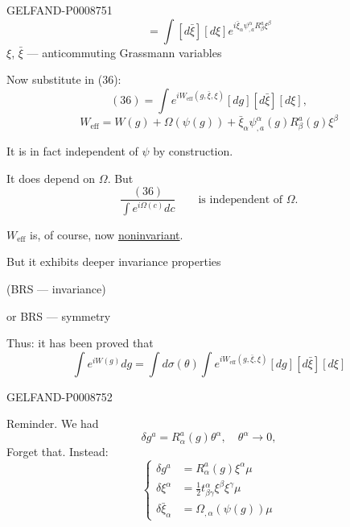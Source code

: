 \begin{GelfandAdjacentEvidence}{GELFAND-P000875}{1}
\[
=\int[d\bar\xi][d\xi]e^{i\bar\xi_\alpha\psi^\alpha_{,a}R_\beta^a\xi^\beta}
\]
$\xi$, $\bar\xi$ --- anticommuting Grassmann variables

Now substitute in (36):
\begin{equation*}
(36)=\int e^{iW_{\mathrm{eff}}(g,\bar\xi,\xi)}[dg][d\bar\xi][d\xi],
\tag{38}
\end{equation*}
\begin{equation*}
W_{\mathrm{eff}}=W(g)+\Omega(\psi(g))+\bar\xi_\alpha\psi^\alpha_{,a}(g)R_\beta^a(g)\xi^\beta
\tag{39}
\end{equation*}

It is in fact independent of $\psi$ by construction.

It does depend on $\Omega$. But
\begin{equation*}
\frac{(36)}{\int e^{i\Omega(c)}dc}\qquad\text{is independent of $\Omega$.}
\tag{40}
\end{equation*}

$W_{\mathrm{eff}}$ is, of course, now \uline{noninvariant}.

But it exhibits deeper invariance properties

(BRS --- invariance)

or BRS --- symmetry

Thus: it has been proved that
\begin{equation*}
\int e^{iW(g)}dg=\int d\sigma(\theta)\int e^{iW_{\mathrm{eff}}(g,\bar\xi,\xi)}[dg][d\bar\xi][d\xi]
\tag{41}
\end{equation*}
\end{GelfandAdjacentEvidence}
\begin{GelfandAdjacentEvidence}{GELFAND-P000875}{2}


Reminder. We had
\begin{equation*}
\delta g^a=R_\alpha^a(g)\theta^\alpha,\quad\theta^\alpha\to0,
\tag{42}
\end{equation*}
Forget that. Instead:
\begin{equation*}
\left\{\begin{aligned}
\delta g^a &= R_\alpha^a(g)\xi^\alpha\mu\\
\delta\xi^\alpha &= \tfrac12 t^\alpha_{\beta\gamma}\xi^\beta\xi^\gamma\mu\\
\delta\bar\xi_\alpha &= \Omega_{,\alpha}(\psi(g))\mu
\end{aligned}\right.
\tag{43}
\end{equation*}
\end{GelfandAdjacentEvidence}
